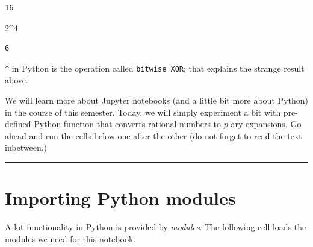\documentclass[
  letterpaper,
  DIV=11,
  numbers=noendperiod]{scrreprt}
\newenvironment{Shaded}{\begin{snugshade}}{\end{snugshade}}
\newcommand{\DecValTok}[1]{\textcolor[rgb]{0.68,0.00,0.00}{#1}}
\newcommand{\OperatorTok}[1]{\textcolor[rgb]{0.37,0.37,0.37}{#1}}
\theoremstyle{plain}
\theoremstyle{plain}
\theoremstyle{definition}
\theoremstyle{definition}
\theoremstyle{definition}
\theoremstyle{plain}
\theoremstyle{plain}
\theoremstyle{remark}
\begin{document}
\begin{verbatim}
16
\end{verbatim}

\begin{Shaded}
\begin{Highlighting}[]
\DecValTok{2}\OperatorTok{\^{}}\DecValTok{4}
\end{Highlighting}
\end{Shaded}

\begin{verbatim}
6
\end{verbatim}

\texttt{\^{}} in Python is the operation called \texttt{bitwise\ XOR};
that explains the strange result above.

We will learn more about Jupyter notebooks (and a little bit more about
Python) in the course of this semester. Today, we will simply experiment
a bit with pre-defined Python function that converts rational numbers to
\(p\)-ary expansions. Go ahead and run the cells below one after the
other (do not forget to read the text inbetween.)

\begin{center}\rule{0.5\linewidth}{0.5pt}\end{center}

\section{Importing Python modules}\label{importing-python-modules}

A lot functionality in Python is provided by \emph{modules}. The
following cell loads the modules we need for this notebook.
\end{document}
